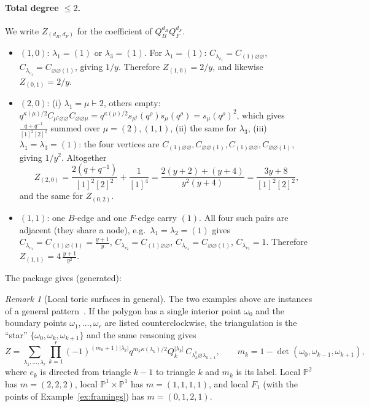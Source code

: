 \documentclass[11pt]{article}
\theoremstyle{plain}
\theoremstyle{definition}
\theoremstyle{remark}
\newtheorem{remark}[theorem]{Remark}
\newcommand{\PP}{\mathbb{P}}
\newcommand{\qrho}{q^{\rho}}
\newcommand{\es}{\varnothing}
\newcommand{\tr}{{\mathsf t}}
\newcommand{\lt}[1]{#1^{\tr}}
\begin{document}
\paragraph{Total degree $\le2$.} We write $Z_{(d_B,d_F)}$ for the coefficient of $Q_B^{d_B}Q_F^{d_F}$.
\begin{itemize}
\item $(1,0)$: $\lambda_1=(1)$ or $\lambda_3=(1)$. For $\lambda_1=(1)$: $C_{\lambda_{v_1}}=C_{(1)\es\es}$,
$C_{\lambda_{v_4}}=C_{\es\es(1)}$, giving $1/y$. Therefore $Z_{(1,0)}=2/y$, and likewise $Z_{(0,1)}=2/y$.
\item $(2,0)$: (i) $\lambda_1=\mu\vdash2$, others empty: $q^{\kappa(\mu)/2}C_{\lt\mu\es\es}C_{\es\es\mu}
=q^{\kappa(\mu)/2}s_{\lt\mu}(\qrho)s_\mu(\qrho)=s_\mu(\qrho)^2$, which gives
$\frac{q+q^{-1}}{[1]^2[2]^2}$ summed over $\mu=(2),(1,1)$, (ii) the same for $\lambda_3$, (iii)
$\lambda_1=\lambda_3=(1)$: the four vertices are $C_{(1)\es\es},C_{\es\es(1)},C_{(1)\es\es},C_{\es\es(1)}$,
giving $1/y^2$. Altogether
\begin{equation}
Z_{(2,0)}=\frac{2(q+q^{-1})}{[1]^2[2]^2}+\frac1{[1]^4}=\frac{2(y+2)+(y+4)}{y^2(y+4)}=\frac{3y+8}{[1]^2[2]^2},
\end{equation}
and the same for $Z_{(0,2)}$.
\item $(1,1)$: one $B$-edge and one $F$-edge carry $(1)$. All four such pairs are adjacent
(they share a node), e.g.\ $\lambda_1=\lambda_2=(1)$ gives $C_{\lambda_{v_1}}=C_{(1)\es(1)}=\frac{y+1}y$,
$C_{\lambda_{v_2}}=C_{(1)\es\es}$, $C_{\lambda_{v_4}}=C_{\es\es(1)}$, $C_{\lambda_{v_3}}=1$. Therefore
$Z_{(1,1)}=4\,\frac{y+1}{y^2}$.
\end{itemize}
The package gives (generated):


\begin{remark}[Local toric surfaces in general]\label{rem:chain}
The two examples above are instances of a general pattern~\cite[\S2.5.2]{Kon}. If the polygon
has a single interior point $\omega_0$ and the boundary points $\omega_1,\ldots,\omega_r$ are
listed counterclockwise, the triangulation is the ``star'' $\{\omega_0,\omega_k,\omega_{k+1}\}$
and the same reasoning gives
\begin{equation}\label{eq:chain}
Z=\sum_{\lambda_1,\ldots,\lambda_r}\prod_{k=1}^r(-1)^{(m_k+1)|\lambda_k|}q^{m_k\kappa(\lambda_k)/2}
Q_k^{|\lambda_k|}\,C_{\lt\lambda_k\es\lambda_{k+1}},\qquad m_k=1-\det(\omega_0,\omega_{k-1},\omega_{k+1}),
\end{equation}
where $e_k$ is directed from triangle $k-1$ to triangle $k$ and $m_k$ is its label. Local $\PP^2$
has $m=(2,2,2)$, local $\PP^1\times\PP^1$ has $m=(1,1,1,1)$, and local $F_1$ (with the points of
Example~\ref{ex:framings}) has $m=(0,1,2,1)$.
\end{remark}
\end{document}
